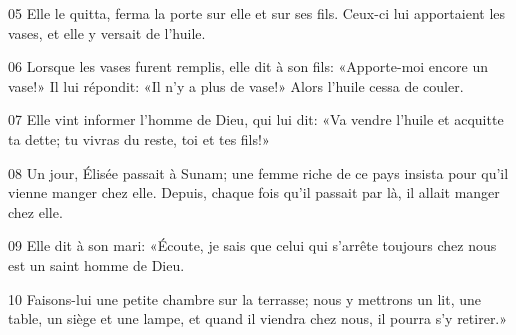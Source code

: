 
05 Elle le quitta, ferma la porte sur elle et sur ses fils. Ceux-ci lui apportaient les vases, et elle y versait de l’huile.

06 Lorsque les vases furent remplis, elle dit à son fils: «Apporte-moi encore un vase!» Il lui répondit: «Il n’y a plus de vase!» Alors l’huile cessa de couler.

07 Elle vint informer l’homme de Dieu, qui lui dit: «Va vendre l’huile et acquitte ta dette; tu vivras du reste, toi et tes fils!»

08 Un jour, Élisée passait à Sunam; une femme riche de ce pays insista pour qu’il vienne manger chez elle. Depuis, chaque fois qu’il passait par là, il allait manger chez elle.

09 Elle dit à son mari: «Écoute, je sais que celui qui s’arrête toujours chez nous est un saint homme de Dieu.

10 Faisons-lui une petite chambre sur la terrasse; nous y mettrons un lit, une table, un siège et une lampe, et quand il viendra chez nous, il pourra s’y retirer.»
